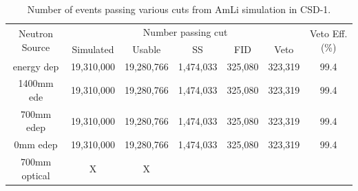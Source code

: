 \begin{table}[!htbp]
    \centering
    \begin{tabular}{c|c|c|c|c|c|c}
         \multirow{2}{*}{Neutron Source} & \multicolumn{5}{c|}{Number passing cut}      & \multirow{2}{*}{Veto Eff. (\%)}  \\ 
                         & Simulated  & Usable     & SS        & FID     & Veto         &                                  \\ \hline
        energy dep       & 19,310,000 & 19,280,766 & 1,474,033 & 325,080 & 323,319      & 99.4                             \\
        1400mm ede       & 19,310,000 & 19,280,766 & 1,474,033 & 325,080 & 323,319      & 99.4                             \\
        700mm edep       & 19,310,000 & 19,280,766 & 1,474,033 & 325,080 & 323,319      & 99.4                             \\
        0mm edep         & 19,310,000 & 19,280,766 & 1,474,033 & 325,080 & 323,319      & 99.4                             \\
        700mm optical    & X          & X          &           &         &              & 
    \end{tabular}
    \caption{Number of events passing various cuts from AmLi simulation in CSD-1.}
    \label{tab:amli_neutron_simulations_veto_efficiency}
\end{table}





\clearpage

